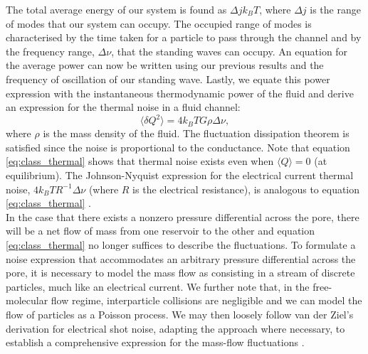 \documentclass[%
 reprint,
 aps,
 prb,
 epsf,
]{revtex4-2}
\begin{document}
   The total average energy of our system is found as $\Delta j k_BT$, where $\Delta j$ is the range of modes that our system can occupy. The occupied range of modes is characterised by the time taken for a particle to pass through the channel and by the frequency range, $\Delta \nu$, that the standing waves can occupy. An equation for the average power can now be written using our previous results and the frequency of oscillation of our standing wave. Lastly, we equate this power expression with the instantaneous thermodynamic power of the fluid and derive an expression for the thermal noise in a fluid channel:
    \begin{equation}\label{eq:class_thermal}
        \langle \delta Q^2 \rangle = 4k_BTG\rho \Delta \nu,
    \end{equation}
    where $\rho$ is the mass density of the fluid. The fluctuation dissipation theorem is satisfied since the noise is proportional to the conductance. Note that equation \ref{eq:class_thermal} shows that thermal noise exists even when $\langle Q \rangle = 0$ (at equilibrium). The Johnson-Nyquist expression for the electrical current thermal noise, $4k_BTR^{-1}\Delta\nu$ (where $R$ is the electrical resistance), is analogous to equation \ref{eq:class_thermal} \cite{nyquist}.\\




In the case that there exists a nonzero pressure differential across the pore, there will be a net
flow of mass from one reservoir to the other and equation \ref{eq:class_thermal} no longer suffices
to describe the fluctuations. To formulate a noise expression that accommodates an
arbitrary pressure differential across the pore, it is necessary to model the mass flow as consisting in
a stream of discrete particles, much like an electrical current. We further note that, in the free-molecular flow regime, interparticle collisions are negligible and we can model the flow of particles as a Poisson process. We may then loosely follow van der Ziel’s derivation for electrical shot noise, adapting the approach where necessary,
to establish a comprehensive expression for the mass-flow fluctuations \cite{vanderziel}.\\
\end{document}
